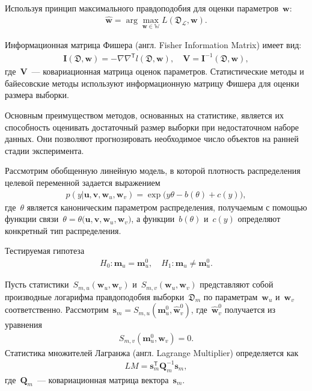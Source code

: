 Используя принцип максимального правдоподобия для оценки параметров~$\textbf{w}$:
\[
\label{eq:ps:5}
\begin{aligned}
	\hat{\textbf{w}} = \arg\max_{\textbf{w}\in\mathbb{W}}L\left(\mathfrak{D}_{\mathcal{L}}, \textbf{w}\right).
\end{aligned}
\]

Информационная матрица Фишера (англ. Fisher Information Matrix) имеет вид:
\[
\label{eq:ps:6}
\begin{aligned}
	\textbf{I}\left(\mathfrak{D}, \textbf{w}\right) = -\nabla\nabla^{\mathsf{T}}l\left(\mathfrak{D}, \textbf{w}\right), \quad  \textbf{V} = \textbf{I}^{-1}\left(\mathfrak{D}, \textbf{w}\right),
\end{aligned}
\]
где~$\textbf{V}$~--- ковариационная матрица оценок параметров. Статистические методы и байесовские методы используют информационную матрицу Фишера для оценки размера выборки.

Основным преимуществом методов, основанных на статистике, является их способность оценивать достаточный размер выборки при недостаточном наборе данных. Они позволяют прогнозировать необходимое число объектов на ранней стадии эксперимента.

Рассмотрим обобщенную линейную модель, в которой плотность распределения целевой переменной задается выражением
\[
\label{eq:sb:1}
\begin{aligned}
	p(y|\textbf{u},\textbf{v},\textbf{w}_{u},\textbf{w}_{v}) = \exp\bigl(y\theta- b(\theta) + c\left(y\right)\bigr),
\end{aligned}
\]
где~$\theta$ является каноническим параметром распределения, получаемым с помощью функции связи~$\theta=\theta\bigr(\textbf{u},\textbf{v},\textbf{w}_{u},\textbf{w}_{v}\bigr)$, а функции~$b(\theta)$ и~$c(y)$ определяют конкретный тип распределения.

Тестируемая гипотеза
\[
\label{eq:sb:2}
\begin{aligned}
	H_0: \textbf{m}_{u} = \textbf{m}^0_{u}, \quad H_1: \textbf{m}_{u} \not= \textbf{m}^0_{u}.
\end{aligned}
\]

Пусть статистики~$S_{m,u}\left(\textbf{w}_{u}, \textbf{w}_{v}\right)$ и~$S_{m,v}\left(\textbf{w}_{u}, \textbf{w}_{v}\right)$ представляют собой производные логарифма правдоподобия выборки~$\mathfrak{D}_{m}$ по параметрам~$\textbf{w}_{u}$ и~$\textbf{w}_{v}$ соответственно.
Рассмотрим~$\textbf{s}_{m} = S_{m,u}\left(\textbf{m}^{0}_{u}, \hat{\textbf{w}}^{0}_{v}\right)$, где~$\hat{\textbf{w}}^{0}_{v}$ получается из уравнения
\[
\label{eq:sb:3}
\begin{aligned}
	S_{m,v}\left(\textbf{m}^{0}_{u}, \textbf{w}_{v}\right) = 0.
\end{aligned}
\]
Статистика множителей Лагранжа (англ. Lagrange Multiplier) определяется как
\[
\label{eq:sb:4}
\begin{aligned}
	LM = \textbf{s}^{\mathsf{T}}_{m}\textbf{Q}_{m}^{-1}\textbf{s}_{m},
\end{aligned}
\]
где~$\textbf{Q}_{m}$~--- ковариационная матрица вектора~$\textbf{s}_{m}$.

